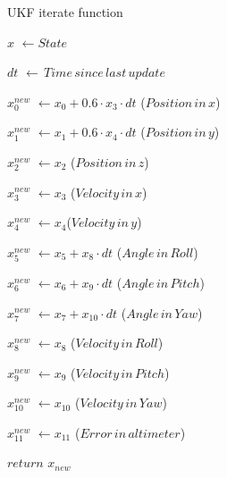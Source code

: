 \documentclass[../Head/report.tex]{subfiles}
\begin{document}
\begin{Pseudo}{UKF iterate function}{}
\begin{Indentation}
	\item $x$ \( \leftarrow State \)
	\item $dt$ \( \leftarrow\, Time\, since\, last\, update \)
	\item $x^{new}_0$ \(\leftarrow x_0 + 0.6 \cdot x_3 \cdot dt\) \qquad ($Position\, in\, x$)
	\item $x^{new}_1$ \(\leftarrow x_1 + 0.6 \cdot x_4 \cdot dt\) \qquad ($Position\, in\, y$)
	\item $x^{new}_2$ \(\leftarrow x_2\) \qquad ($Position\, in\, z$)
	\item $x^{new}_3$ \(\leftarrow x_3\) \qquad ($Velocity\, in\, x$)
	\item $x^{new}_4$ \(\leftarrow x_4\)\qquad ($Velocity\, in\, y$)
	\item $x^{new}_5$ \(\leftarrow x_5 + x_8 \cdot dt\) \qquad ($Angle\, in\, Roll$)
	\item $x^{new}_6$ \(\leftarrow x_6 + x_{9} \cdot dt\) \qquad ($Angle\, in\, Pitch$)
	\item $x^{new}_7$ \(\leftarrow x_7 + x_{10} \cdot dt\) \qquad ($Angle\, in\, Yaw$)
	\item $x^{new}_8$ \(\leftarrow x_8 \) \qquad ($Velocity\, in\, Roll$)
	\item $x^{new}_9$ \(\leftarrow x_9 \) \qquad ($Velocity\, in\, Pitch$)
	\item $x^{new}_{10}$ \(\leftarrow x_{10} \) \qquad ($Velocity\, in\, Yaw$)
	\item $x^{new}_{11}$ \(\leftarrow x_{11} \) \qquad ($Error\, in\, altimeter$)
	\item $return$ $x_{new}$	
\end{Indentation}
\label{pse:ukf_iterate_function}
\end{Pseudo}
\end{document}
